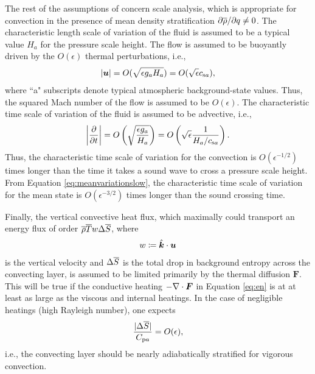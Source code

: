 \documentclass[12pt]{article}
\newcommand{\vecf}{\bm{F}}
\newcommand{\veck}{\hat{\bm{k}}}
\newcommand{\csa}{c_{{\rm s}a}}
\newcommand{\cpa}{C_{{\rm p}a}}
\begin{document}
	The rest of the assumptions of \citet{Gough1969} concern scale analysis, which is appropriate for convection in the presence of mean density stratification $\partial\overline{\rho}/\partial q\neq0$. The characteristic length scale of variation of the fluid is assumed to be a typical value $H_a$ for the pressure scale height. The flow is assumed to be buoyantly driven by the $O(\epsilon)$ thermal perturbations, i.e., 
	\begin{align}\label{eq:scaleu}
		|\vecu| = O(\sqrt{\epsilon g_a H_a}) = O(\sqrt{\epsilon}\csa),
	\end{align}
	where ``a" subscripts denote typical atmospheric background-state values. Thus, the squared Mach number of the flow is assumed to be $O(\epsilon)$. The characteristic time scale of variation of the fluid is assumed to be advective, i.e., 
	\begin{align}\label{eq:scaleu}
	\left|\pderiv{}{t}\right|  = O\left(\sqrt{\frac{\epsilon g_a}{H_a}}\right) = O\left(\sqrt{\epsilon} \frac{1}{H_a/\csa}\right).
	\end{align}
	Thus, the characteristic time scale of variation for the convection is $O(\epsilon^{-1/2})$ times longer than the time it takes a sound wave to cross a pressure scale height. From Equation \eqref{eq:meanvariationslow}, the characteristic time scale of variation for the mean state is $O(\epsilon^{-3/2})$ times longer than the sound crossing time. 
	
	Finally, the vertical convective heat flux, which maximally could transport an energy flux of order $\overline{\rho} \overline{T} w \Delta\overline{S}$, where 
	\begin{align}\label{eq:defw}
		w\define\veck\cdot\vecu
	\end{align} is the vertical velocity and $\Delta \overline{S} $ is the total drop in background entropy across the convecting layer, is assumed to be limited primarily by the thermal diffusion $\vecf$. This will be true if the conductive heating $-\Div \vecf$ in Equation \eqref{eq:en} is at at least as large as the viscous and internal heatings. In the case of negligible heatings (high Rayleigh number), one expects
	\begin{align}
		\frac{|\Delta\entrover|}{\cpa} = O(\epsilon),
	\end{align}
	i.e., the convecting layer should be nearly adiabatically stratified for vigorous convection. 
	
\end{document}
